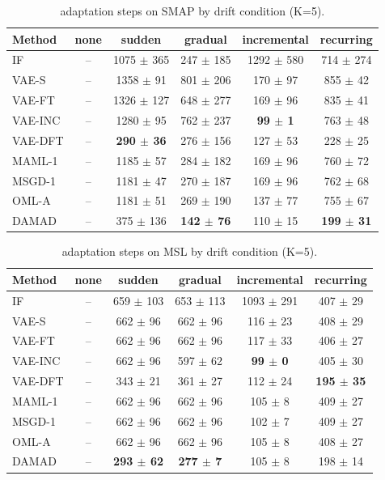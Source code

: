 \begin{table}[t]
\centering
\small
\caption{adaptation steps on SMAP by drift condition (K=5).}
\label{tab:drift_adaptation_steps_smap}
\begin{tabular}{lccccc}
\toprule
Method & none & sudden & gradual & incremental & recurring \\
\midrule
IF & – & 1075 $\pm$ 365 & 247 $\pm$ 185 & 1292 $\pm$ 580 & 714 $\pm$ 274 \\
VAE-S & – & 1358 $\pm$ 91 & 801 $\pm$ 206 & 170 $\pm$ 97 & 855 $\pm$ 42 \\
VAE-FT & – & 1326 $\pm$ 127 & 648 $\pm$ 277 & 169 $\pm$ 96 & 835 $\pm$ 41 \\
VAE-INC & – & 1280 $\pm$ 95 & 762 $\pm$ 237 & \textbf{99 $\pm$ 1} & 763 $\pm$ 48 \\
VAE-DFT & – & \textbf{290 $\pm$ 36} & 276 $\pm$ 156 & 127 $\pm$ 53 & 228 $\pm$ 25 \\
MAML-1 & – & 1185 $\pm$ 57 & 284 $\pm$ 182 & 169 $\pm$ 96 & 760 $\pm$ 72 \\
MSGD-1 & – & 1181 $\pm$ 47 & 270 $\pm$ 187 & 169 $\pm$ 96 & 762 $\pm$ 68 \\
OML-A & – & 1181 $\pm$ 51 & 269 $\pm$ 190 & 137 $\pm$ 77 & 755 $\pm$ 67 \\
DAMAD & – & 375 $\pm$ 136 & \textbf{142 $\pm$ 76} & 110 $\pm$ 15 & \textbf{199 $\pm$ 31} \\
\bottomrule
\end{tabular}
\end{table}

\begin{table}[t]
\centering
\small
\caption{adaptation steps on MSL by drift condition (K=5).}
\label{tab:drift_adaptation_steps_msl}
\begin{tabular}{lccccc}
\toprule
Method & none & sudden & gradual & incremental & recurring \\
\midrule
IF & – & 659 $\pm$ 103 & 653 $\pm$ 113 & 1093 $\pm$ 291 & 407 $\pm$ 29 \\
VAE-S & – & 662 $\pm$ 96 & 662 $\pm$ 96 & 116 $\pm$ 23 & 408 $\pm$ 29 \\
VAE-FT & – & 662 $\pm$ 96 & 662 $\pm$ 96 & 117 $\pm$ 33 & 406 $\pm$ 27 \\
VAE-INC & – & 662 $\pm$ 96 & 597 $\pm$ 62 & \textbf{99 $\pm$ 0} & 405 $\pm$ 30 \\
VAE-DFT & – & 343 $\pm$ 21 & 361 $\pm$ 27 & 112 $\pm$ 24 & \textbf{195 $\pm$ 35} \\
MAML-1 & – & 662 $\pm$ 96 & 662 $\pm$ 96 & 105 $\pm$ 8 & 409 $\pm$ 27 \\
MSGD-1 & – & 662 $\pm$ 96 & 662 $\pm$ 96 & 102 $\pm$ 7 & 409 $\pm$ 27 \\
OML-A & – & 662 $\pm$ 96 & 662 $\pm$ 96 & 105 $\pm$ 8 & 408 $\pm$ 27 \\
DAMAD & – & \textbf{293 $\pm$ 62} & \textbf{277 $\pm$ 7} & 105 $\pm$ 8 & 198 $\pm$ 14 \\
\bottomrule
\end{tabular}
\end{table}

